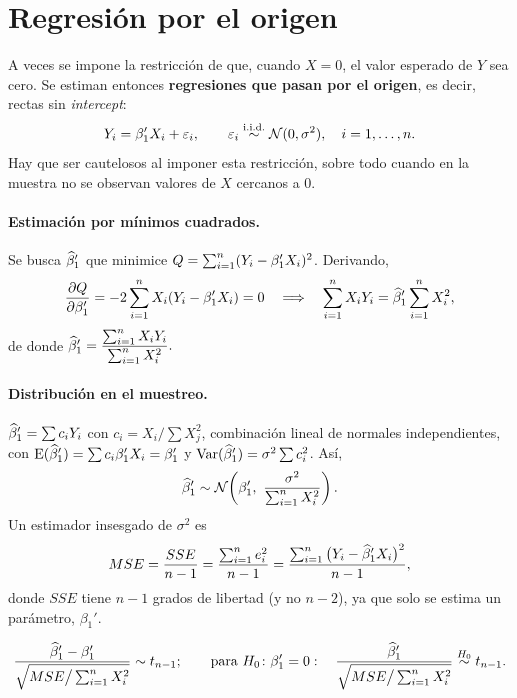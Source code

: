 \section{Regresión por el origen}
\label{sec:t3-origen}

A veces se impone la restricción de que, cuando $X=0$, el valor esperado de $Y$ sea cero. Se
estiman entonces \textbf{regresiones que pasan por el origen}, es decir, rectas sin \emph{intercept}:
\[
  Y_i = \beta_1'X_i + \varepsilon_i, \qquad \varepsilon_i\overset{\text{i.i.d.}}{\sim}\mathcal{N}(0,\sigma^2),\quad i=1,\ldots,n .
\]
Hay que ser cautelosos al imponer esta restricción, sobre todo cuando en la muestra no se
observan valores de $X$ cercanos a 0.

\paragraph{Estimación por mínimos cuadrados.} Se busca $\widehat{\beta}_1'$ que minimice
$Q=\sum_{i=1}^{n} (Y_i-\beta_1'X_i)^2$. Derivando,
\[
  \frac{\partial Q}{\partial\beta_1'} = -2\sum_{i=1}^{n} X_i(Y_i-\beta_1'X_i) = 0
  \quad\Longrightarrow\quad
  \sum_{i=1}^{n} X_iY_i = \widehat{\beta}_1'\sum_{i=1}^{n} X_i^2 ,
\]
de donde
\(
  \widehat{\beta}_1' = \dfrac{\sum_{i=1}^{n} X_iY_i}{\sum_{i=1}^{n} X_i^2}.
\)

\paragraph{Distribución en el muestreo.} $\widehat{\beta}_1'=\sum c_iY_i$ con
$c_i=X_i/\sum X_j^2$, combinación lineal de normales independientes, con
$\operatorname{E}(\widehat{\beta}_1')=\sum c_i\beta_1'X_i=\beta_1'$ y $\operatorname{Var}(\widehat{\beta}_1')=\sigma^2\sum c_i^2$. Así,
\[
  \widehat{\beta}_1' \sim \mathcal{N}\!\left(\beta_1',\ \frac{\sigma^2}{\sum_{i=1}^{n} X_i^2}\right).
\]
Un estimador insesgado de $\sigma^2$ es
\[
  MSE = \frac{SSE}{n-1} = \frac{\sum_{i=1}^{n} e_i^2}{n-1} = \frac{\sum_{i=1}^{n} \big(Y_i-\widehat{\beta}_1'X_i\big)^2}{n-1},
\]
donde $SSE$ tiene $n-1$ grados de libertad (y no $n-2$), ya que solo se estima un parámetro,
$\beta_1'$.

\begin{resumen}
  \[
    \frac{\widehat{\beta}_1'-\beta_1'}{\sqrt{MSE\big/\sum_{i=1}^n X_i^2}} \sim t_{n-1};
    \qquad\text{para } H_0\colon\beta_1'=0:\quad
    \frac{\widehat{\beta}_1'}{\sqrt{MSE\big/\sum_{i=1}^n X_i^2}} \overset{H_0}{\sim} t_{n-1}.
  \]
\end{resumen}

